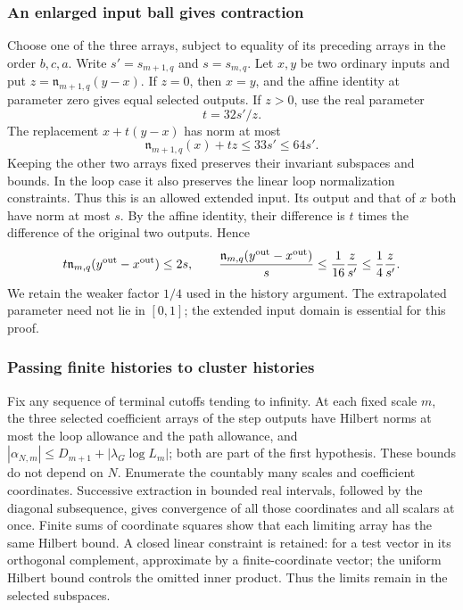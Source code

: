 \subsubsection{An enlarged input ball gives contraction}
Choose one of the three arrays, subject to equality of its preceding
arrays in the order $b,c,a$. Write $s'=s_{m+1,q}$ and $s=s_{m,q}$.
Let $x,y$ be two ordinary inputs and put
$z=\mathfrak n_{m+1,q}(y-x)$. If $z=0$, then $x=y$, and the
affine identity at parameter zero gives equal selected outputs.
If $z>0$, use the real parameter
\[
                        t=32s'/z.
\]
The replacement $x+t(y-x)$ has norm at most
\[
             \mathfrak n_{m+1,q}(x)+tz\le33s'\le64s'.
\]
Keeping the other two arrays fixed preserves their invariant
subspaces and bounds. In the loop case it also preserves the
linear loop normalization constraints. Thus this is an allowed
extended input. Its output and that of $x$ both have norm at
most $s$. By the affine identity, their difference is $t$ times
the difference of the original two outputs. Hence
\begin{equation}
 t\mathfrak n_{m,q}(y^{\rm out}-x^{\rm out})\le2s,
 \qquad
 \frac{\mathfrak n_{m,q}(y^{\rm out}-x^{\rm out})}{s}
       \le\frac1{16}\frac{z}{s'}
       \le\frac14\frac{z}{s'}.
\label{eq:background-contraction}
\end{equation}
We retain the weaker factor $1/4$ used in the history argument.
The extrapolated parameter need not lie in $[0,1]$; the extended
input domain is essential for this proof.

\subsubsection{Passing finite histories to cluster histories}
Fix any sequence of terminal cutoffs tending to infinity. At each
fixed scale $m$, the three selected coefficient arrays of the
step outputs have Hilbert norms at most the loop allowance and the
path allowance, and $|\alpha_{N,m}|\le D_{m+1}+|\lambda_G\log L_m|$;
both are part of the first hypothesis. These bounds do not depend on
$N$.
Enumerate the countably many scales and coefficient coordinates.
Successive extraction in bounded real intervals, followed by the
diagonal subsequence, gives convergence of all those coordinates
and all scalars at once. Finite sums of coordinate squares show
that each limiting array has the same Hilbert bound. A closed
linear constraint is retained: for a test vector in its orthogonal
complement, approximate by a finite-coordinate vector; the uniform
Hilbert bound controls the omitted inner product. Thus the limits
remain in the selected subspaces.

